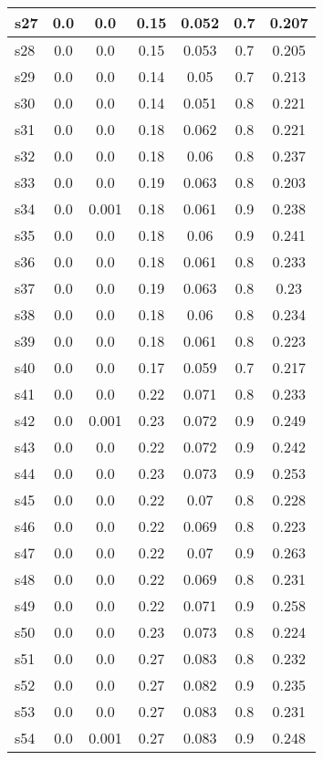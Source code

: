 \documentclass{article}
\begin{document}
\begin{tabular}{|l|c|c|c|c|c|c|}
\hline
s27 &0.0 & 0.0 & 0.15 & 0.052 & 0.7 & 0.207\\
\hline
s28 &0.0 & 0.0 & 0.15 & 0.053 & 0.7 & 0.205\\
\hline
s29 &0.0 & 0.0 & 0.14 & 0.05 & 0.7 & 0.213\\
\hline
s30 &0.0 & 0.0 & 0.14 & 0.051 & 0.8 & 0.221\\
\hline
s31 &0.0 & 0.0 & 0.18 & 0.062 & 0.8 & 0.221\\
\hline
s32 &0.0 & 0.0 & 0.18 & 0.06 & 0.8 & 0.237\\
\hline
s33 &0.0 & 0.0 & 0.19 & 0.063 & 0.8 & 0.203\\
\hline
s34 &0.0 & 0.001 & 0.18 & 0.061 & 0.9 & 0.238\\
\hline
s35 &0.0 & 0.0 & 0.18 & 0.06 & 0.9 & 0.241\\
\hline
s36 &0.0 & 0.0 & 0.18 & 0.061 & 0.8 & 0.233\\
\hline
s37 &0.0 & 0.0 & 0.19 & 0.063 & 0.8 & 0.23\\
\hline
s38 &0.0 & 0.0 & 0.18 & 0.06 & 0.8 & 0.234\\
\hline
s39 &0.0 & 0.0 & 0.18 & 0.061 & 0.8 & 0.223\\
\hline
s40 &0.0 & 0.0 & 0.17 & 0.059 & 0.7 & 0.217\\
\hline
s41 &0.0 & 0.0 & 0.22 & 0.071 & 0.8 & 0.233\\
\hline
s42 &0.0 & 0.001 & 0.23 & 0.072 & 0.9 & 0.249\\
\hline
s43 &0.0 & 0.0 & 0.22 & 0.072 & 0.9 & 0.242\\
\hline
s44 &0.0 & 0.0 & 0.23 & 0.073 & 0.9 & 0.253\\
\hline
s45 &0.0 & 0.0 & 0.22 & 0.07 & 0.8 & 0.228\\
\hline
s46 &0.0 & 0.0 & 0.22 & 0.069 & 0.8 & 0.223\\
\hline
s47 &0.0 & 0.0 & 0.22 & 0.07 & 0.9 & 0.263\\
\hline
s48 &0.0 & 0.0 & 0.22 & 0.069 & 0.8 & 0.231\\
\hline
s49 &0.0 & 0.0 & 0.22 & 0.071 & 0.9 & 0.258\\
\hline
s50 &0.0 & 0.0 & 0.23 & 0.073 & 0.8 & 0.224\\
\hline
s51 &0.0 & 0.0 & 0.27 & 0.083 & 0.8 & 0.232\\
\hline
s52 &0.0 & 0.0 & 0.27 & 0.082 & 0.9 & 0.235\\
\hline
s53 &0.0 & 0.0 & 0.27 & 0.083 & 0.8 & 0.231\\
\hline
s54 &0.0 & 0.001 & 0.27 & 0.083 & 0.9 & 0.248\\

\end{tabular}
\end{document}
